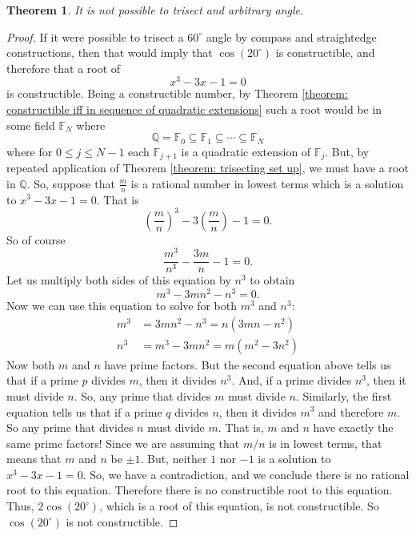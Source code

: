 \documentclass[11pt]{article}
\newtheorem{theorem}{Theorem}[section]
\theoremstyle{definition}
\begin{document}
\begin{theorem}
  It is not possible to trisect and arbitrary angle.
  \label{theorem: can't trisect arbitrary angle}
\end{theorem}
\begin{proof}
  If it were possible to trisect a $60^\circ$ angle by compass and straightedge constructions, then that would imply that
  $\cos(20^\circ)$ is constructible, and therefore that a root of 
  \[ x^3 - 3x -1 = 0 \]
  is constructible. Being a constructible number, by Theorem \ref{theorem: constructible iff in sequence of quadratic extensions}
  such a root would be in some field $\mathbb{F}_N$ where
  \[ \mathbb{Q}=\mathbb{F}_0 \subseteq \mathbb{F}_1 \subseteq \cdots \subseteq \mathbb{F}_N \]
  where for $0 \leq j \leq N-1$ each $\mathbb{F}_{j+1}$ is a quadratic extension of $\mathbb{F}_j$. But, by repeated application of
  Theorem \ref{theorem: trisecting set up}, we must have a root in $\mathbb{Q}$. So, suppose that $\frac{m}{n}$ is a rational number in 
  lowest terms which is a solution to $x^3 -3x -1 =0$. That is
  \[ \left( \frac{m}{n} \right)^3 - 3\left( \frac{m}{n} \right) - 1 = 0.\]
  So of course
  \[ \frac{m^3}{n^3} - \frac{3m}{n} - 1 = 0.\]
  Let us multiply both sides of this equation by $n^3$ to obtain
  \[ m^3 - 3mn^2 - n^3 = 0.\]
  Now we can use this equation to solve for both $m^3$ and $n^3$:
  \begin{align*}
    m^3 &= 3mn^2 -n^3 = n(3mn-n^2)\\
    n^3 &= m^3 - 3mn^2 = m(m^2-3n^2)
  \end{align*}
  Now both $m$ and $n$ have prime factors. But the second equation above tells us that if a prime $p$ divides $m$, then it divides $n^3$. And, if
  a prime divides $n^3$, then it must divide $n$. So, any prime that divides $m$ must divide $n$. Similarly, the first equation tells us that if
  a prime $q$ divides $n$, then it divides $m^3$ and therefore $m$. So any prime that divides $n$ must divide $m$. That is, $m$ and $n$ have 
  exactly the same prime factors!  Since we are assuming that $m/n$ is in lowest terms, that means that $m$ and $n$ be $\pm 1$. But, neither 
  $1$ nor $-1$ is a solution to $x^3 - 3x -1 =0$. So, we have a contradiction, and we conclude there is no rational root to this equation. Therefore
  there is no constructible root to this equation. Thus, $2\cos(20^\circ)$, which is a root of this equation, is not constructible. So
  $\cos(20^\circ)$ is not constructible.
\end{proof}
\end{document}
